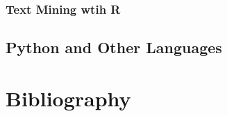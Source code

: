 \documentclass[
]{book}
\begin{document}
\hypertarget{text-mining-wtih-r}{%
\subsection{Text Mining wtih R}\label{text-mining-wtih-r}}

\hypertarget{python-and-other-languages}{%
\section{Python and Other Languages}\label{python-and-other-languages}}

\hypertarget{bibliography}{%
\chapter*{Bibliography}\label{bibliography}}

  
\end{document}
